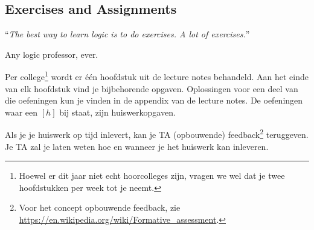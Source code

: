 



\subsection*{Exercises and Assignments}

``{\it The best way to learn logic is to do exercises. A lot of exercises.}''
\begin{flushright}
Any logic professor, ever.
\end{flushright}

Per college\footnote{Hoewel er dit jaar niet echt hoorcolleges zijn, vragen we wel dat je twee hoofdstukken per week tot je neemt.} wordt er één hoofdstuk uit de lecture notes behandeld. Aan het einde van elk hoofdstuk vind je bijbehorende opgaven. Oplossingen voor een deel van die oefeningen kun je vinden in de appendix van de lecture notes. De oefeningen waar een $[h]$ bij staat, zijn huiswerkopgaven.

Als je je huiswerk op tijd inlevert, kan je TA (opbouwende) feedback\footnote{Voor het concept opbouwende feedback, zie  \url{https://en.wikipedia.org/wiki/Formative_assessment}.} teruggeven. Je TA zal je laten weten hoe en wanneer je het huiswerk kan inleveren.

